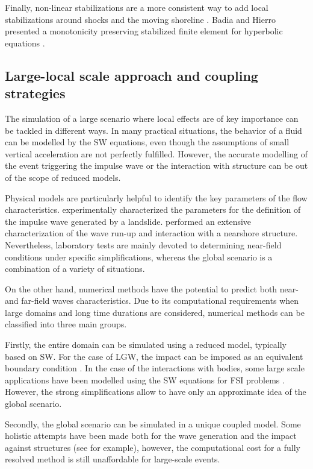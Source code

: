 Finally, non-linear stabilizations are a more consistent way to add local stabilizations around shocks and the moving shoreline \cite{codina2011}. Badia and Hierro presented a monotonicity preserving stabilized finite element for hyperbolic equations \cite{badia2014}.



\subsection{Large-local scale approach and coupling strategies}


The simulation of a large scenario where local effects are of key importance can be tackled in different ways. In many practical situations, the behavior of a fluid can be modelled by the SW equations, even though the assumptions of small vertical acceleration are not perfectly fulfilled. However, the accurate modelling of the event triggering the impulse wave or the interaction with structure can be out of the scope of reduced models.

Physical models are particularly helpful to identify the key parameters of the flow characteristics. \cite{noda1970water, fritz2004near, mulligan2017} experimentally characterized the parameters for the definition of the impulse wave generated by a landslide. \cite{krautwald2020,krautwald2022} performed an extensive characterization of the wave run-up and interaction with a nearshore structure. Nevertheless, laboratory tests are mainly devoted to determining near-field conditions under specific simplifications, whereas the global scenario is a combination of a variety of situations.

On the other hand, numerical methods have the potential to predict both near- and far-field waves characteristics. Due to its computational requirements when large domains and long time durations are considered, numerical methods can be classified into three main groups.

Firstly, the entire domain can be simulated using a reduced model, typically based on SW. For the case of LGW, the impact can be imposed as an equivalent boundary condition \cite{waythomas2003numerical, ataie2008mapping}. In the case of the interactions with bodies, some large scale applications have been modelled using the SW equations for FSI problems \cite{geveler2010,bresch2021}. However, the strong simplifications allow to have only an approximate idea of the global scenario.

Secondly, the global scenario can be simulated in a unique coupled model. Some holistic attempts have been made both for the wave generation and the impact against structures (see \cite{CrostaVajont,franci20203dA,zhu2018} for example), however, the computational cost for a fully resolved method is still unaffordable for large-scale events.

